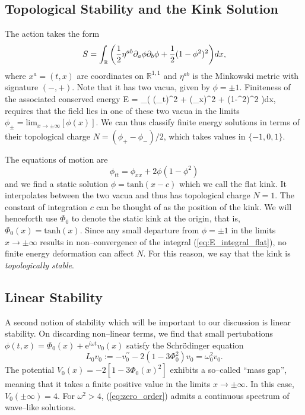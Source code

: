 \subsection{Topological Stability and the Kink Solution}
The action takes the form
\[
S=\int_{\mathbb{R}}\bigg( \frac{1}{2}\eta^{ab}\partial_a\phi\partial_b\phi + \frac{1}{2}(1-\phi^2)^2\bigg)dx,
\]
where $x^a=(t,x)$ are coordinates on $\mathbb{R}^{1,1}$ and $\eta^{ab}$ is the Minkowski metric with signature $(-,+)$. Note that it has two vacua, given by $\phi=\pm 1$. Finiteness of the associated conserved energy
\be \label{eq:E_integral_flat}
E = \int_\R \bigg( (\phi_t)^2 + (\phi_x)^2 + (1-\phi^2)^2 \bigg)dx,
\ee
requires that the field lies in one of these two vacua in the limits $\phi_\pm=\mathrm{lim}_{x\rightarrow \pm \infty}[\phi(x)]$. We can thus classify finite energy solutions in terms of their topological charge $N = (\phi_+-\phi_-)/2$, which takes values in $\{-1,0,1\}$.




The equations of motion are
\begin{equation}
\label{eom:R11}
\phi_{tt}=\phi_{xx} + 2\phi(1-\phi^2)
\end{equation}
and we find a static solution $\phi=\mathrm{tanh}(x-c)$ which we call the flat kink. It interpolates between the two vacua and thus has topological charge $N=1$. The constant of integration $c$ can be thought of as the position of the kink. We will henceforth use $\Phi_0$ to denote the static kink at the origin, that is, $\Phi_0(x)=\mathrm{tanh}(x)$. Since any small departure from $\phi=\pm 1$ in the limits $x\rightarrow\pm\infty$ results in non--convergence of the integral (\ref{eq:E_integral_flat}), no finite energy deformation can affect $N$. For this reason, we say that the kink is \textit{topologically stable}. 

\subsection{Linear Stability}

A second notion of stability which will be important to our discussion is linear stability. On discarding non--linear terms, we find that small pertubations $\phi(t,x)=\Phi_0(x)+\mathrm{e}^{i\omega t}v_0(x)$ satisfy the Schr\"odinger equation
\begin{equation}
\label{eq:zero_order}
L_0v_0:=-v_0^{\prime\prime} - 2(1-3\Phi_0^2)v_0 = \omega^2_0v_0.
\end{equation}
The potential $V_0(x)=-2[1-3\Phi_0(x)^2]$ exhibits a so--called ``mass gap'', meaning that it takes a finite positive value in the limits $x\rightarrow\pm\infty$. In this case, $V_0(\pm\infty)=4$. For $\omega^2>4$, (\ref{eq:zero_order}) admits a continuous spectrum of wave--like solutions.

